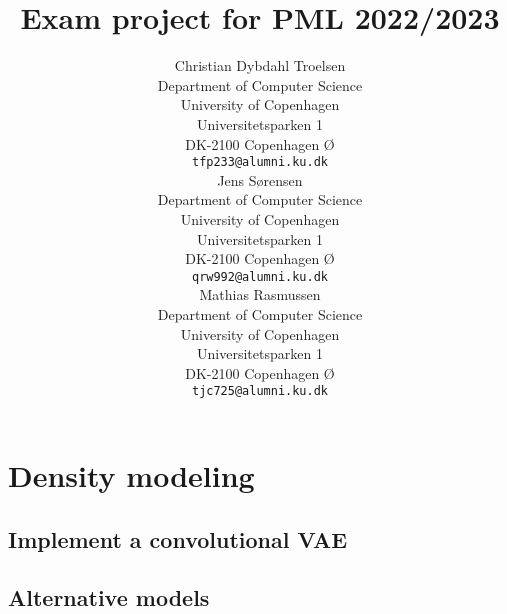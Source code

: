 

\title{Exam project for PML 2022/2023}

\author{ 
	{Christian Dybdahl Troelsen} \\
	Department of Computer Science\\
	University of Copenhagen\\
	Universitetsparken 1 \\
    DK-2100 Copenhagen Ø \\
	\texttt{tfp233@alumni.ku.dk} \\
	\And
	{Jens Sørensen} \\
	Department of Computer Science\\
	University of Copenhagen\\
	Universitetsparken 1 \\
    DK-2100 Copenhagen Ø \\
	\texttt{qrw992@alumni.ku.dk} \\
	\And
	{Mathias Rasmussen} \\
	Department of Computer Science\\
	University of Copenhagen\\
	Universitetsparken 1 \\
    DK-2100 Copenhagen Ø \\
	\texttt{tjc725@alumni.ku.dk} \\
}

\renewcommand{\headeright}{Report}
\renewcommand{\undertitle}{Report}

\renewcommand{\shorttitle}{PML Report}



\maketitle
\section{Density modeling}
\subsection{Implement a convolutional VAE}

\subsection{Alternative models}
